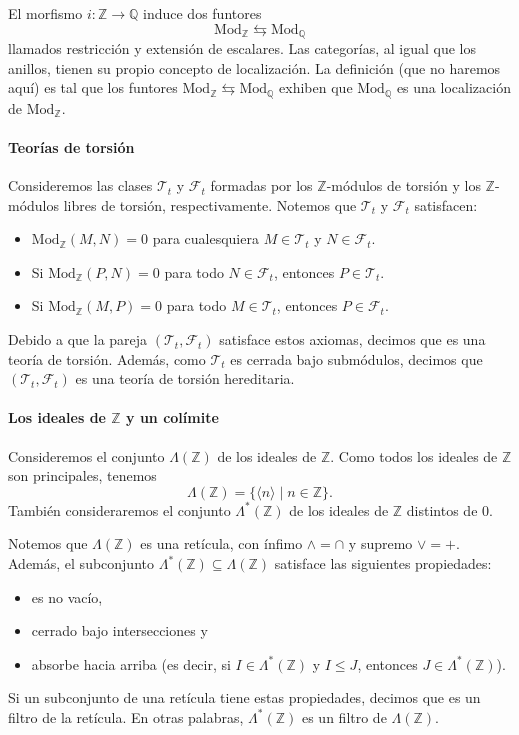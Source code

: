 \documentclass[12pt,letterpaper,titlepage]{article}
\theoremstyle{definition}
\renewcommand\sup{\vee}
\renewcommand\inf{\wedge}
\newcommand\Z{\mathbb Z}
\newcommand\Q{\mathbb Q}
\newcommand\nti[1]{\Lambda^{\text{*}}({#1})}
\newcommand\scr[1]{\mathscr{#1}}
\newcommand\<{\langle}
\renewcommand\>{\rangle}
\newcommand{\Mod}{\mathrm{Mod}}
\begin{document}
El morfismo $i:\Z\to\Q$ induce dos funtores
\[
    \Mod_\Z\leftrightarrows\Mod_\Q
\]
llamados restricción y extensión de escalares.
Las categorías, al igual que los anillos,
tienen su propio concepto de localización.
La definición (que no haremos aquí) es tal que
los funtores $\Mod_\Z\leftrightarrows\Mod_\Q$
exhiben que $\Mod_\Q$ es una localización de $\Mod_\Z$.

\paragraph{Teorías de torsión}
Consideremos las clases $\scr T_t$ y $\scr F_t$
formadas por los $\Z$-módulos de torsión y los $\Z$-módulos
libres de torsión, respectivamente.
Notemos que $\scr T_t$ y $\scr F_t$ satisfacen:
\begin{itemize}
    \item
    $\Mod_\Z(M,N)=0$ para cualesquiera $M\in\scr T_t$
    y $N\in\scr F_t$.
    \item
    Si $\Mod_\Z(P,N)=0$ para todo $N\in\scr F_t$,
    entonces $P\in\scr T_t$.
    \item
    Si $\Mod_\Z(M,P)=0$ para todo $M\in\scr T_t$,
    entonces $P\in\scr F_t$.
\end{itemize}
Debido a que la pareja $(\scr T_t,\scr F_t)$ satisface estos
axiomas, decimos que es una teoría de torsión.
Además, como $\scr T_t$ es cerrada bajo submódulos,
decimos que $(\scr T_t,\scr F_t)$ es una teoría de torsión hereditaria.

\paragraph{Los ideales de $\Z$ y un colímite}
Consideremos el conjunto $\Lambda(\Z)$ de los ideales de $\Z$.
Como todos los ideales de $\Z$ son principales, tenemos
\[
    \Lambda(\Z)=\{\<n\>\mid n\in \Z\}
.\]
También consideraremos el conjunto $\nti\Z$
de los ideales de $\Z$ distintos de $0$.

Notemos que $\Lambda(\Z)$ es una retícula, con ínfimo $\inf=\cap$
y supremo $\sup=+$.
Además, el subconjunto $\nti\Z\subseteq\Lambda(\Z)$
satisface las siguientes propiedades:
\begin{itemize}
    \item es no vacío,
    \item cerrado bajo intersecciones y
    \item absorbe hacia arriba
    (es decir, si $I\in\nti\Z$ y $I\leq J$,
    entonces $J\in\nti\Z$).
\end{itemize}
Si un subconjunto de una retícula tiene estas propiedades,
decimos que es un filtro de la retícula.
En otras palabras, $\nti\Z$ es un filtro de $\Lambda(\Z)$.
\end{document}
